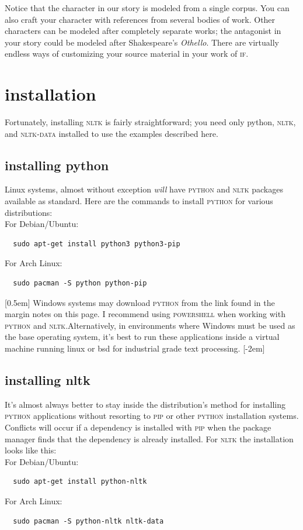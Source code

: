 Notice that the character in our story is modeled from a single
corpus. You can also craft your character with references from several bodies of
work. Other characters can be modeled after completely
separate works; the antagonist in your story could be modeled after
Shakespeare's \textit{Othello}. There are virtually endless ways of customizing
your source material in your work of \textsc{if}.
\section{installation}
Fortunately, installing \textsc{nltk} is fairly straightforward; you need only
python, \textsc{nltk}, and \textsc{nltk-data} installed to use the examples
described here.

\subsection{installing python}
Linux systems, almost without exception \textit{will} have \textsc{python} and \textsc{nltk}
packages available as standard. Here are the commands to install \textsc{python}
for various distributions:\\[1em]
For Debian/Ubuntu:
\begin{lstlisting}
  sudo apt-get install python3 python3-pip
\end{lstlisting}
For Arch Linux:
\begin{lstlisting}
  sudo pacman -S python python-pip
\end{lstlisting}
[0.5em]
Windows systems may download \textsc{python} from the link found in the margin notes on this page. I
recommend using 
\textsc{powershell} when working with \textsc{python} and
\textsc{nltk}.Alternatively, in environments where Windows must be used as the
base operating system, it’s best to run these applications inside a virtual
machine running linux or bsd for industrial grade text processing.
[-2em]
\subsection{installing nltk}
It's almost always better to stay inside the distribution's method for
installing \textsc{python} applications without resorting to \textsc{pip} or
other \textsc{python}
installation systems. Conflicts will occur if a dependency is
installed with \textsc{pip} when the package manager finds that the dependency is already installed. For \textsc{nltk} the installation looks like this:\\[1em]
For Debian/Ubuntu:
\begin{lstlisting}
  sudo apt-get install python-nltk 
\end{lstlisting}
For Arch Linux:
\begin{lstlisting}
  sudo pacman -S python-nltk nltk-data
\end{lstlisting}

